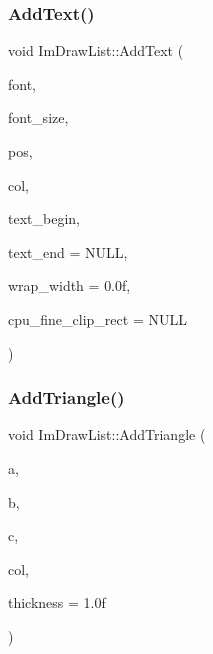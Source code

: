 \mbox{\label{struct_im_draw_list_a0a226cbe9bb1480428e145d8535cda26}} 
\subsubsection{\texorpdfstring{Add\+Text()}{AddText()}\hspace{0.1cm}{\footnotesize\ttfamily [2/2]}}
{\footnotesize\ttfamily void Im\+Draw\+List\+::\+Add\+Text (\begin{DoxyParamCaption}\item[{const \mbox{\hyperlink{struct_im_font}{Im\+Font}} $\ast$}]{font,  }\item[{float}]{font\+\_\+size,  }\item[{const \mbox{\hyperlink{struct_im_vec2}{Im\+Vec2}} \&}]{pos,  }\item[{\mbox{\hyperlink{imgui_8h_a118cff4eeb8d00e7d07ce3d6460eed36}{Im\+U32}}}]{col,  }\item[{const char $\ast$}]{text\+\_\+begin,  }\item[{const char $\ast$}]{text\+\_\+end = {\ttfamily NULL},  }\item[{float}]{wrap\+\_\+width = {\ttfamily 0.0f},  }\item[{const \mbox{\hyperlink{struct_im_vec4}{Im\+Vec4}} $\ast$}]{cpu\+\_\+fine\+\_\+clip\+\_\+rect = {\ttfamily NULL} }\end{DoxyParamCaption})}

\mbox{\label{struct_im_draw_list_ad04c8e04644b1cf54c7c7b8f352d5e41}} 
\subsubsection{\texorpdfstring{Add\+Triangle()}{AddTriangle()}}
{\footnotesize\ttfamily void Im\+Draw\+List\+::\+Add\+Triangle (\begin{DoxyParamCaption}\item[{const \mbox{\hyperlink{struct_im_vec2}{Im\+Vec2}} \&}]{a,  }\item[{const \mbox{\hyperlink{struct_im_vec2}{Im\+Vec2}} \&}]{b,  }\item[{const \mbox{\hyperlink{struct_im_vec2}{Im\+Vec2}} \&}]{c,  }\item[{\mbox{\hyperlink{imgui_8h_a118cff4eeb8d00e7d07ce3d6460eed36}{Im\+U32}}}]{col,  }\item[{float}]{thickness = {\ttfamily 1.0f} }\end{DoxyParamCaption})}

